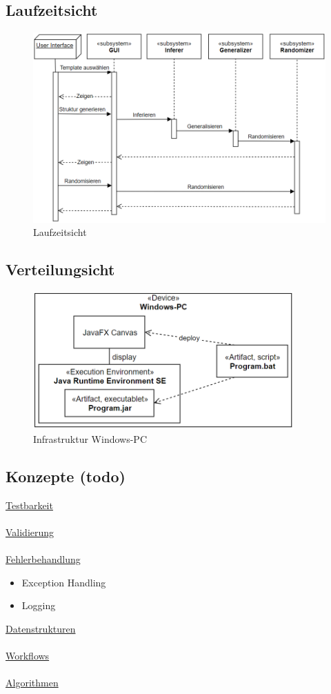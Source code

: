 \documentclass[11pt]{article}
\begin{document}
    \subsection{Laufzeitsicht}
    \begin{figure}[H]
        \centering
        \includegraphics[width=14cm]{../images/Laufzeitsicht.PNG}
        \caption{Laufzeitsicht}
    \end{figure}

    \subsection{Verteilungsicht}
    \begin{figure}[H]
        \centering
        \includegraphics[width=10cm]{../images/Verteilungssicht.PNG}
        \caption{Infrastruktur Windows-PC}
    \end{figure}

    \subsection{Konzepte (todo)}
    \underline{Testbarkeit}\\~\\
    \underline{Validierung}\\~\\
    \underline{Fehlerbehandlung}
    \begin{itemize}
        \item Exception Handling
        \item Logging
    \end{itemize}
    \underline{Datenstrukturen}\\~\\
    \underline{Workflows}\\~\\
    \underline{Algorithmen}
\end{document}
